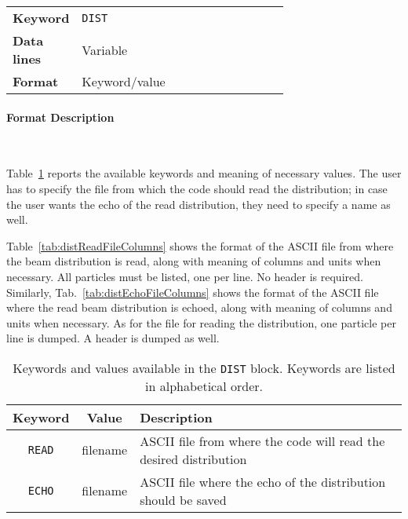 \bigskip
\begin{tabular}{@{}llp{0.7\linewidth}}
    \textbf{Keyword}    & \texttt{DIST}\index{DIST} \\
    \textbf{Data lines} & Variable \\
    \textbf{Format}     & Keyword/value
\end{tabular}

\paragraph{Format Description}~

Table~\ref{tab:distKeys} reports the available keywords and meaning of necessary values. The user has to specify the file from which the code should read the distribution; in case the user wants the echo of the read distribution, they need to specify a name as well.

Table~\ref{tab:distReadFileColumns} shows the format of the ASCII file from where the beam distribution is read, along with meaning of columns and units when necessary.
All particles must be listed, one per line.
No header is required.
Similarly, Tab.~\ref{tab:distEchoFileColumns} shows the format of the ASCII file where the read beam distribution is echoed, along with meaning of columns and units when necessary.
As for the file for reading the distribution, one particle per line is dumped.
A header is dumped as well.


\bigskip
\begin{center}
\begin{longtable}{|c|c|l|}%
    \caption{Keywords and values available in the \texttt{DIST} block. Keywords are listed in alphabetical order.}
    \label{tab:distKeys} \\*
    \hline
    \rowcolor{blue!30}
    Keyword & Value & Description \\*
    \hline
    \endfirsthead
    \texttt{READ} & filename & ASCII file from where the code will read the desired distribution \\*
    \hline
    \texttt{ECHO} & filename & ASCII file where the echo of the distribution should be saved \\*
    \hline
\end{longtable}
\end{center}

